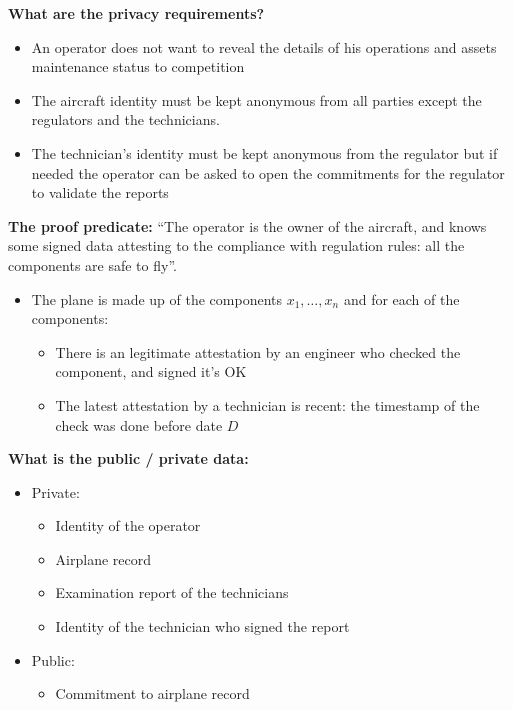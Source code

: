 \textbf{What are the privacy requirements?}
\begin{itemize}
    \item An operator does not want to reveal the details of his operations and assets maintenance status to competition
    \item The aircraft identity must be kept anonymous from all parties except the regulators and the technicians.
    \item The technician’s identity must be kept anonymous from the regulator but if needed the operator can be asked to open the commitments for the regulator to validate the reports
\end{itemize}
 
\textbf{The proof predicate:} “The operator is the owner of the aircraft, and knows some signed data attesting to the compliance with regulation rules: all the components are safe to fly”. 
	\begin{itemize}
     \item The plane is made up of the components $x_1, \ldots, x_n$ and for each of the components: 
				\begin{itemize}
            \item There is an legitimate attestation by an engineer who checked the component, and signed it's OK
            \item The latest attestation by a technician is recent: the timestamp of the check was done before date $D$
				\end{itemize}
	\end{itemize}


\textbf{What is the public / private data:}
    \begin{itemize}
		\item Private:
        \begin{itemize}
				\item Identity of the operator
        \item Airplane record
        \item Examination report of the technicians
        \item Identity of the technician who signed the report
				\end{itemize}
    \item Public:
        \begin{itemize}
				\item Commitment to airplane record
				\end{itemize}
		\end{itemize}

